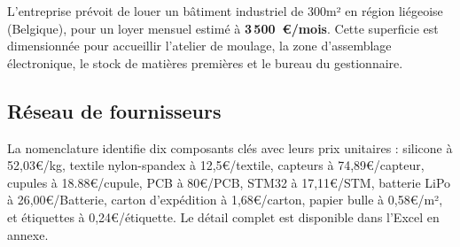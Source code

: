 L'entreprise prévoit de louer un bâtiment industriel de 300m² en région liégeoise
(Belgique), pour un loyer mensuel estimé à \textbf{3\,500~\euro{}/mois}. Cette superficie est
dimensionnée pour accueillir l'atelier de moulage, la zone d'assemblage électronique, le stock de
matières premières et le bureau du gestionnaire.

\subsection{Réseau de fournisseurs}



La nomenclature identifie dix composants clés avec leurs prix unitaires : silicone à 52,03\euro{}/kg, textile nylon-spandex à 12,5\euro{}/textile, capteurs à 74,89\euro{}/capteur, cupules à 18.88\euro{}/cupule, PCB à 80\euro{}/PCB, STM32 à 17,11\euro{}/STM, batterie LiPo à 26,00\euro{}/Batterie, carton d'expédition à 1,68\euro{}/carton, papier bulle à 0,58\euro{}/m², et étiquettes à 0,24\euro{}/étiquette. Le détail complet est disponible dans l'Excel en annexe.



